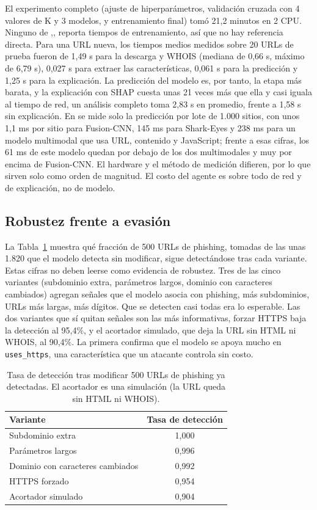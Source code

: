 El experimento completo (ajuste de hiperparámetros, validación cruzada con 4 valores de K y 3 modelos, y entrenamiento final) tomó 21,2 minutos en 2 CPU. Ninguno de \cite{kalabarige2022multilayer},\cite{kalabarige2023boosting},\cite{alsariera2020ai} reporta tiempos de entrenamiento, así que no hay referencia directa. Para una URL nueva, los tiempos medios medidos sobre 20 URLs de prueba fueron de 1,49 s para la descarga y WHOIS (mediana de 0,66 s, máximo de 6,79 s), 0,027 s para extraer las características, 0,061 s para la predicción y 1,25 s para la explicación. La predicción del modelo es, por tanto, la etapa más barata, y la explicación con SHAP cuesta unas 21 veces más que ella y casi iguala al tiempo de red, un análisis completo toma 2,83 s en promedio, frente a 1,58 s sin explicación. En \cite{duy2024study} se mide solo la predicción por lote de 1.000 sitios, con unos 1,1 ms por sitio para Fusion-CNN, 145 ms para Shark-Eyes y 238 ms para un modelo multimodal que usa URL, contenido y JavaScript; frente a esas cifras, los 61 ms de este modelo quedan por debajo de los dos multimodales y muy por encima de Fusion-CNN. El hardware y el método de medición difieren, por lo que sirven solo como orden de magnitud. El costo del agente es sobre todo de red y de explicación, no de modelo.

\subsection{Robustez frente a evasión}

La Tabla~\ref{tab:evasion} muestra qué fracción de 500 URLs de phishing, tomadas de las unas 1.820 que el modelo detecta sin modificar, sigue detectándose tras cada variante. Estas cifras no deben leerse como evidencia de robustez. Tres de las cinco variantes (subdominio extra, parámetros largos, dominio con caracteres cambiados) agregan señales que el modelo asocia con phishing, más subdominios, URLs más largas, más dígitos. Que se detecten casi todas era lo esperable. Las dos variantes que sí quitan señales son las más informativas, forzar HTTPS baja la detección al 95,4\%, y el acortador simulado, que deja la URL sin HTML ni WHOIS, al 90,4\%. La primera confirma que el modelo se apoya mucho en \texttt{uses\_https}, una característica que un atacante controla sin costo. \newline

\begin{table}[t]
\caption{Tasa de detección tras modificar 500 URLs de phishing ya detectadas. El acortador es una simulación (la URL queda sin HTML ni WHOIS).}
\label{tab:evasion}
\centering
\footnotesize
\begin{tabular}{lc}
\hline
\textbf{Variante} & \textbf{Tasa de detección}\\
\hline
Subdominio extra     & 1,000\\
Parámetros largos    & 0,996\\
Dominio con caracteres cambiados & 0,992\\
HTTPS forzado        & 0,954\\
Acortador simulado   & 0,904\\
\hline
\end{tabular}
\end{table}

